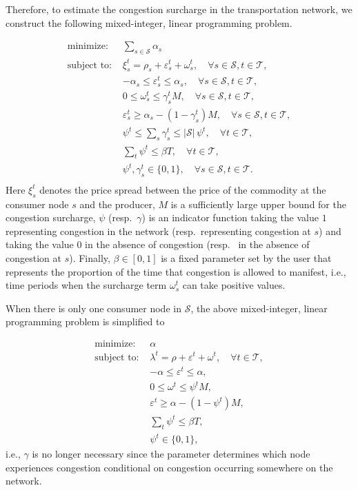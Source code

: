 \documentclass[11pt]{m2pi}
\newcommand{\cS}{\mathcal{S}}
\newcommand{\cT}{\mathcal{T}}
\newcommand{\ves}{\varepsilon}
\begin{document}
Therefore, to estimate the congestion surcharge in the transportation network, we construct the following mixed-integer, linear programming problem.  

\begin{align}\label{1}
\text{minimize: } &\sum_{s\in\cS} \alpha_s\\
\text{subject to: } &\xi_s^t = \rho_s + \ves_s^t +\omega_s^t,\quad \forall \nonumber s\in\cS,t\in\cT,\\ \nonumber
&-\alpha_s\leq\ves_s^t \leq \alpha_s,\quad \forall s\in\cS,t\in\cT,\\ \nonumber
&0\leq\omega_s^t\leq \gamma_s^t M,\quad \forall s\in\cS,t\in\cT,\\ \nonumber
&\ves_s^t \geq \alpha_s - (1-\gamma_s^t) M,\quad \forall s\in\cS,t\in\cT,\\ \nonumber
&\psi^t\leq\sum_s \gamma_s^t\leq |\cS|\, \psi^t, \quad \forall t\in\cT,\\ \nonumber
&\sum_t \psi^t \leq \beta T, \quad \forall t\in\cT,\\ \nonumber
&\psi^t, \gamma_s^t \in\{0,1\}, \quad \forall s\in\cS,t\in\cT.\\ \nonumber
\end{align}
Here $\xi_{s}^{t}$ denotes the price spread between the price of the commodity at the consumer node $s$ and the producer, $M$ is a sufficiently large upper bound for the congestion surcharge, $\psi$ (resp.~$\gamma$) is an indicator function taking the value $1$ representing congestion in the network (resp.~representing congestion at $s$) and taking the value 0 in the absence of congestion (resp.~ in the absence of congestion at $s$). Finally, $\beta\in[0,1]$ is a fixed parameter set by the user that represents the proportion of the time that congestion is allowed to manifest, i.e., time periods when the surcharge term $\omega_s^t$ can take positive values. 

When there is only one consumer node in $\mathcal{S}$, the above mixed-integer, linear programming problem is simplified to 

\begin{align}\label{2}
\text{minimize: } &\alpha\\ \nonumber
\text{subject to: } &\lambda^t = \rho + \ves^t +\omega^t, \quad \forall t\in\cT,\\\nonumber
&-\alpha\leq\ves^t \leq \alpha,\\\nonumber
&0\leq\omega^t\leq \psi^t M,\\\nonumber
&\ves^t \geq \alpha - (1-\psi^t) M,\\ \nonumber
&\sum_t \psi^t \leq \beta T,\\\nonumber
&\psi^t \in\{0,1\},\nonumber
\end{align}
i.e., $\gamma$ is no longer necessary since the parameter determines which node experiences congestion conditional on congestion occurring somewhere on the network.
\end{document}
